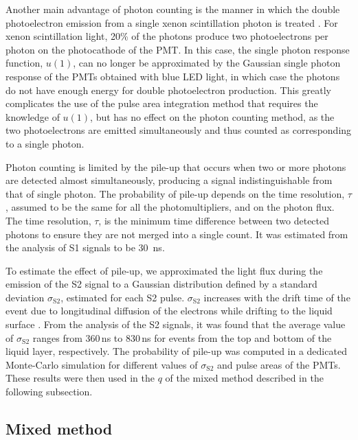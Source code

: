 \documentclass[a4paper,11pt]{article}
\begin{document}
Another main advantage of photon counting is the manner in which the double photoelectron emission from a single xenon scintillation photon is treated \cite{Faham2015}. For xenon scintillation light, 20\% of the photons produce two photoelectrons per photon on the photocathode of the PMT. In this case,  the single photon response function, $u(1)$, can no longer be approximated by the Gaussian single photon response of the PMTs obtained with blue LED light, in which case the photons do not have enough energy for double photoelectron production. This greatly complicates the use of the pulse area integration method that requires the knowledge of $u(1)$, but has no effect on the photon counting method, as the two photoelectrons are emitted simultaneously and thus counted as corresponding to a single photon.

Photon counting is limited by the pile-up that occurs when two or more photons are detected almost simultaneously, producing a signal indistinguishable from that of single photon. The probability of pile-up depends on the time resolution, $\tau$, assumed to be the same for all the photomultipliers, and on the photon flux. The time resolution, $\tau$, is the minimum time difference between two detected photons to ensure they are not merged into a single count. It was estimated from the analysis of S1 signals to be 30~ns.

To estimate the effect of pile-up, we approximated the light flux during the emission of the S2 signal to a Gaussian distribution defined by a standard deviation $\sigma_{\mathrm S2}$, estimated for each S2 pulse. $\sigma_{\mathrm S2}$ increases with the drift time of the event due to longitudinal diffusion of the electrons while drifting to the liquid surface \cite{Sorensen2011}. From the analysis of the S2 signals, it was found that the average value of $\sigma_{\mathrm S2}$ ranges from 360\,ns to 830\,ns for events from the top and bottom of the liquid layer, respectively. The probability of pile-up was computed in a dedicated Monte-Carlo simulation for different values of $\sigma_{\mathrm S2}$ and pulse areas of the PMTs. These results were then used in the $q$ of the mixed method described in the following subsection.

\subsection{Mixed method}
\end{document}
